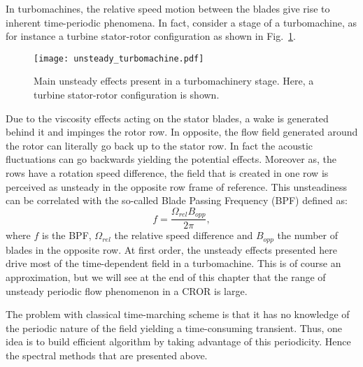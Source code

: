 In turbomachines, the relative speed motion between the blades
give rise to inherent time-periodic phenomena.
In fact, consider a stage of a turbomachine, as for instance
a turbine stator-rotor configuration as shown 
in Fig.~\ref{fig:sm_unsteady_turbomachine}. 
\begin{figure}[htbp]
  \centering
  \texttt{[image: unsteady\_turbomachine.pdf]}
  \caption{Main unsteady effects present in a turbomachinery stage. Here, a turbine stator-rotor
  configuration is shown.}
  \label{fig:sm_unsteady_turbomachine}
\end{figure}
Due to the
viscosity effects acting on the stator blades, 
a wake is generated behind it and 
impinges the rotor row. In opposite, the flow field
generated around the rotor can literally go back up
to the stator row. In fact
the acoustic fluctuations can go backwards yielding
the potential effects. Moreover as, the rows have a 
rotation speed difference,
the field that is created in one row is perceived as unsteady in the opposite 
row frame of reference. This unsteadiness can be
correlated with the so-called Blade Passing Frequency (BPF) defined as:
\begin{equation}
	f = \frac{\Omega_{rel} B_{opp}}{2 \pi},
\end{equation}
where $f$ is the BPF, $\Omega_{rel}$ the relative speed difference 
and $B_{opp}$ the number of blades in the opposite row.
At first order, the unsteady effects presented here drive
most of the time-dependent field in a turbomachine. This 
is of course an approximation, but we will see at the end
of this chapter that the range of unsteady periodic
flow phenomenon in a CROR is large.

The problem with classical time-marching scheme is 
that it has no knowledge
of the periodic nature of the field yielding a time-consuming
transient. Thus, one idea is to build efficient algorithm
by taking advantage of this periodicity. 
Hence the spectral methods that are
presented above.


